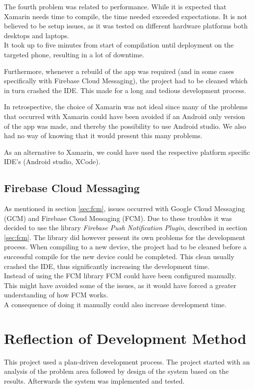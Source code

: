 The fourth problem was related to performance. While it is expected that Xamarin needs time to compile, the time needed exceeded expectations. It is not believed to be setup issues, as it was tested on different hardware platforms both desktops and laptops.\\
It took up to five minutes from start of compilation until deployment on the targeted phone, resulting in a lot of downtime.

Furthermore, whenever a rebuild of the app was required (and in some cases specifically with Firebase Cloud Messaging), the project had to be cleaned which in turn crashed the IDE. This made for a long and tedious development process.

In retrospective, the choice of Xamarin was not ideal since many of the problems that occurred with Xamarin could have been avoided if an Android only version of the app was made, and thereby the possibility to use Android studio. We also had no way of knowing that it would present this many problems.

As an alternative to Xamarin, we could have used the respective platform specific IDE's (Android studio, XCode).

\subsection{Firebase Cloud Messaging}
As mentioned in section \ref{sec:fcm}, issues occurred with Google Cloud Messaging (GCM) and Firebase Cloud Messaging (FCM). Due to these troubles it was decided to use the library \textit{Firebase Push Notification Plugin}, described in section \ref{sec:fcm}. The library did however present its own problems for the development process. When compiling to a new device, the project had to be cleaned before a successful compile for the new device could be completed. This clean usually crashed the IDE, thus significantly increasing the development time.\\
Instead of using the FCM library \cite{fcmplugin} FCM could have been configured manually. This might have avoided some of the issues, as it would have forced a greater understanding of how FCM works.\\
A consequence of doing it manually could also increase development time.

\section{Reflection of Development Method}
This project used a plan-driven development process. The project started with an analysis of the problem area followed by design of the system based on the results. Afterwards the system was implemented and tested.

